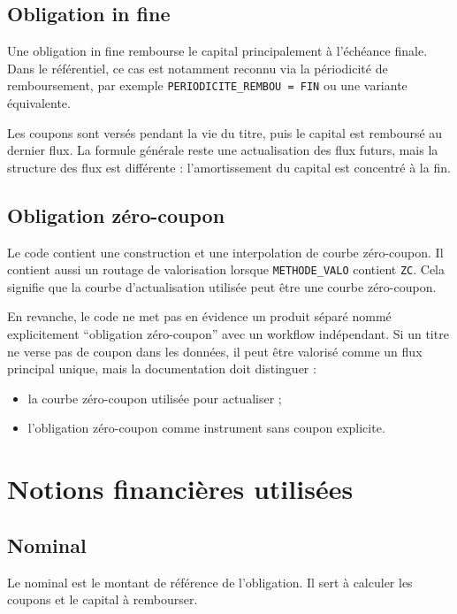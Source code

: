 \documentclass[12pt,a4paper]{article}
\begin{document}
\subsection{Obligation in fine}

Une obligation in fine rembourse le capital principalement à l'échéance finale. Dans le référentiel, ce cas est notamment reconnu via la périodicité de remboursement, par exemple \texttt{PERIODICITE\_REMBOU = FIN} ou une variante équivalente.

Les coupons sont versés pendant la vie du titre, puis le capital est remboursé au dernier flux. La formule générale reste une actualisation des flux futurs, mais la structure des flux est différente : l'amortissement du capital est concentré à la fin.

\subsection{Obligation zéro-coupon}

Le code contient une construction et une interpolation de courbe zéro-coupon. Il contient aussi un routage de valorisation lorsque \texttt{METHODE\_VALO} contient \texttt{ZC}. Cela signifie que la courbe d'actualisation utilisée peut être une courbe zéro-coupon.

En revanche, le code ne met pas en évidence un produit séparé nommé explicitement ``obligation zéro-coupon'' avec un workflow indépendant. Si un titre ne verse pas de coupon dans les données, il peut être valorisé comme un flux principal unique, mais la documentation doit distinguer :

\begin{itemize}
    \item la courbe zéro-coupon utilisée pour actualiser ;
    \item l'obligation zéro-coupon comme instrument sans coupon explicite.
\end{itemize}

\section{Notions financières utilisées}

\subsection{Nominal}

Le nominal est le montant de référence de l'obligation. Il sert à calculer les coupons et le capital à rembourser.
\end{document}
